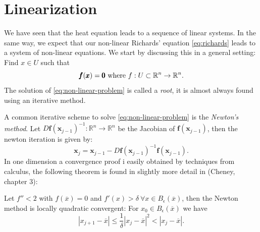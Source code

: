 \documentclass[../Main/main.tex]{subfiles}
\begin{document}
	\section{Linearization}
We have seen that the heat equation leads to a sequence of linear systems. In the same way, we expect that our non-linear Richards' equation \eqref{eq:richards} leads to a system of non-linear equations. We start by discussing this in a general setting: Find $x\in U$ such that 
\begin{equation}\label{eq:non-linear-problem}
	 \pmb{f}(\pmb{x})=\pmb{0} \\ \text{ where } f:U\subset\mathbb{R}^n\rightarrow\mathbb{R}^n.
\end{equation}
The solution of \eqref{eq:non-linear-problem} is called a \emph{root}, it is almost always found using an iterative method.\par 
A common iterative scheme to solve \eqref{eq:non-linear-problem} is the \emph{Newton's method}. Let $D\pmb{f}(\pmb{x}_{j-1})^{-1}:\mathbb{R}^n\rightarrow\mathbb{R}^n$ be the Jacobian of $\pmb{f}(\pmb{x}_{j-1})$, then the newton iteration is given by:
\begin{equation}
	\pmb{x}_j = \pmb{x}_{j-1} -D\pmb{f}(\pmb{x}_{j-1})^{-1}\pmb{f}(\pmb{x}_{j-1}).
\end{equation}
In one dimension a convergence proof i easily obtained by techniques from calculus, the following theorem is found in  slightly more detail in (Cheney\cite{Cheney}, chapter 3):
\begin{theorem}
	Let $f''<2$ with $f(\overline{x})=0$ and $f'(x)> \delta \ \forall x \in B_{\epsilon}(\overline{x})$, then the Newton method is locally quadratic convergent:  For $x_0\in B_{\epsilon}(\overline{x})$ we have
	\begin{equation}
		| x_{j+1}-\overline{x}| \leq \frac{1}{\delta}|x_j - \overline{x}|^2< |x_j-\overline{x}|.
	\end{equation}
\end{theorem}
\end{document}
